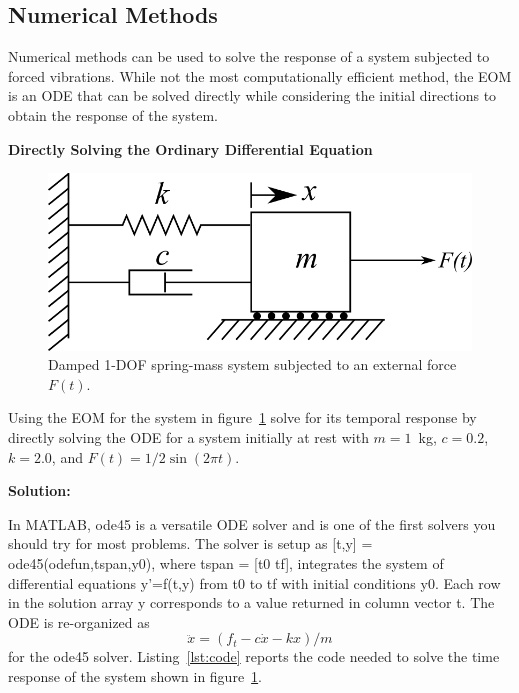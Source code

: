 \documentclass[12pt,letter]{article}
\begin{document}
	\subsection{Numerical Methods}
	
		Numerical methods can be used to solve the response of a system subjected to forced vibrations. While not the most computationally efficient method, the EOM is an ODE that can be solved directly while considering the initial directions to obtain the response of the system. 

\begin{example}
	\textbf{Directly Solving the Ordinary Differential Equation}
	
	\begin{figure}[H]
		\centering
		\includegraphics[]{../figures/1-DOF-spring_dashpot_mass_horizontal_forced.png}
		\caption{Damped 1-DOF spring-mass system subjected to an external force $F(t)$.}
		\label{fig:2-DOF-spring_mass_horizontal_3}
	\end{figure}
	
	
	\noindent Using the EOM for the system in figure~\ref{fig:2-DOF-spring_mass_horizontal_3} solve for its temporal response by directly solving the ODE for a system initially at rest with $m=1$~kg, $c=0.2$, $k=2.0$, and $F(t)=1/2 \sin (2 \pi t)$. 
	
	\noindent \textbf{Solution:} 
	
	
	\noindent In MATLAB, {\ttfamily{}ode45} is a versatile ODE solver and is one of the first solvers you should try for most problems. The solver is setup as {\ttfamily{}[t,y] = ode45(odefun,tspan,y0),} where {\ttfamily{}tspan = [t0 tf],} integrates the system of differential equations {\ttfamily{}y'=f(t,y)} from {\ttfamily{}t0} to {\ttfamily{}tf} with initial conditions {\ttfamily{}y0}. Each row in the solution array y corresponds to a value returned in column vector {\ttfamily{}t}. The ODE is re-organized as 
	\begin{equation}
	\ddot{x} = (f_t - c  \dot{x} - k  x) / m
	\end{equation}
	for the {\ttfamily{}ode45} solver. Listing~\ref{lst:code} reports the code needed to solve the time response of the system shown in figure~\ref{fig:2-DOF-spring_mass_horizontal_3}.


\end{example}
\end{document}
